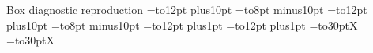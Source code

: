 \documentclass{beamer}
\begin{document}
\begin{frame}{Box diagnostic reproduction}
\begingroup
{} 
=\hbox to12pt{\hskip10pt plus10pt}
=\hbox to8pt{\hskip10pt minus10pt}
=\vbox to12pt{\vskip10pt plus10pt}
=\vbox to8pt{\vskip10pt minus10pt}
=\hbox to12pt{\hskip10pt plus1pt}
=\vbox to12pt{\vskip10pt plus1pt}
=\hbox to30pt{X}
=\vbox to30pt{\hbox{X}}
\endgroup
\end{frame}
\end{document}
